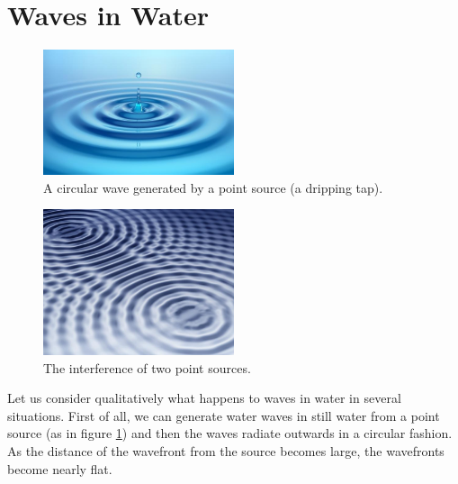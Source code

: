 \documentclass[a4paper]{amsbook}
\newcommand\capcite[1]{}
\begin{document}
\section{Waves in Water}
\begin{figure}
  \centering
  \includegraphics[width=0.5\textwidth]{pointsource}
  \caption{A circular wave generated by a point source (a dripping tap). \capcite{http://addins.wvva.com/blogs/weather/wp-content/uploads/2015/01/rippleinwater.jpg}\label{fig:pointsource}}
\end{figure}
\begin{figure}
  \centering
  \includegraphics[width=0.5\textwidth]{pointsource2}
  \caption{The interference of two point sources. \capcite{http://static.nautil.us/2895_6b8b8e3bd6ad94b985c1b1f1b7a94cb2.jpg}\label{fig:pointsource2}}
\end{figure}
Let us consider qualitatively what happens to waves in water in several situations. First of all, we can generate
water waves in still water from a point source (as in figure \ref{fig:pointsource}) and then the waves radiate outwards in a circular
fashion. As the distance of the wavefront from the source becomes large, the wavefronts become nearly flat.
\end{document}
